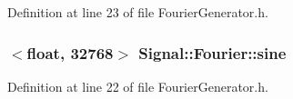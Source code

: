 Definition at line 23 of file Fourier\+Generator.\+h.

\hypertarget{namespaceSignal_1_1Fourier_ab1bf3cdef768a49cf3e927b9daf7da9d}{
\subsubsection[{sine}]{$<$float, 32768$>$ Signal\+::\+Fourier\+::sine\hspace{0.3cm}{\ttfamily [static]}}}\label{namespaceSignal_1_1Fourier_ab1bf3cdef768a49cf3e927b9daf7da9d}


Definition at line 22 of file Fourier\+Generator.\+h.

